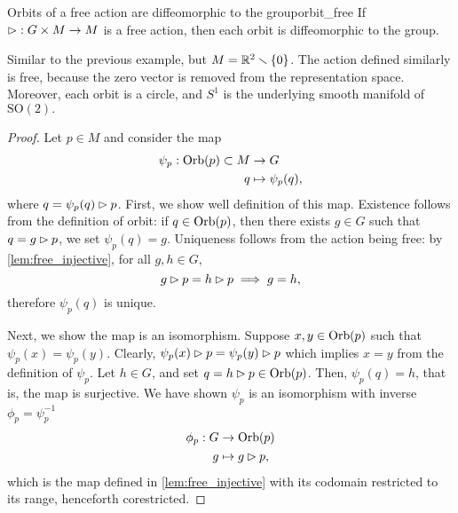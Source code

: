 \begin{theorem}{Orbits of a free action are diffeomorphic to the group}{orbit_free}
    If \(\mathbin{\vartriangleright} : G \times M \to M\) is a free action, then each orbit is diffeomorphic to the group.
\end{theorem}
\begin{example}
    Similar to the previous example, but \(M = \mathbb{R}^2 \smallsetminus \{0\}\). The action defined similarly is free, because the zero vector is removed from the representation space. Moreover, each orbit is a circle, and \(S^1\) is the underlying smooth manifold of \(\mathrm{SO}(2).\)
\end{example}
\begin{proof}
    Let \(p \in M\) and consider the map
    \begin{align*}
        \psi_p : \operatorname{Orb}(p) \subset M &\to G\\
                             q &\mapsto \psi_p(q),
    \end{align*}
    where \(q = \psi_p(q) \mathbin{\vartriangleright} p\). First, we show well definition of this map. Existence follows from the definition of orbit: if \(q \in \operatorname{Orb}(p)\), then there exists \(g \in G\) such that \(q = g \mathbin{\vartriangleright} p\), we set \(\psi_p(q) = g\). Uniqueness follows from the action being free: by \cref{lem:free_injective}, for all \(g, h \in G\),
    \begin{equation*}
        g \mathbin{\vartriangleright} p = h \mathbin{\vartriangleright} p \implies g = h,
    \end{equation*}
    therefore \(\psi_p(q)\) is unique.

    Next, we show the map is an isomorphism. Suppose \(x,y \in \operatorname{Orb}(p)\) such that \(\psi_p(x) = \psi_p(y)\). Clearly, \(\psi_p(x) \mathbin{\vartriangleright} p = \psi_p(y) \mathbin{\vartriangleright} p\) which implies \(x = y\) from the definition of \(\psi_p\). Let \(h \in G\), and set \(q = h \mathbin{\vartriangleright} p \in \operatorname{Orb}(p)\). Then, \(\psi_p(q) = h\), that is, the map is surjective. We have shown \(\psi_p\) is an isomorphism with inverse \(\phi_p = \psi_p^{-1}\)
    \begin{align*}
        \phi_p : G &\to \operatorname{Orb}(p)\\
                 g &\mapsto g \mathbin{\vartriangleright} p,
    \end{align*}
    which is the map defined in \cref{lem:free_injective} with its codomain restricted to its range, henceforth corestricted.

\end{proof}


